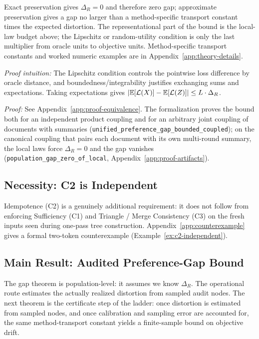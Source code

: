 \noindent Exact preservation gives $\Delta_R = 0$ and therefore zero gap; approximate preservation gives a gap no larger than a method-specific transport constant times the expected distortion. The representational part of the bound is the local-law budget above; the Lipschitz or random-utility condition is only the last multiplier from oracle units to objective units. Method-specific transport constants and worked numeric examples are in Appendix~\ref{app:theory-details}.

\noindent\textit{Proof intuition:} The Lipschitz condition controls the pointwise loss difference by oracle distance, and boundedness/integrability justifies exchanging sums and expectations. Taking expectations gives $|\mathbb{E}[\mathcal{L}(X)] - \mathbb{E}[\mathcal{L}(Z)]| \le L \cdot \Delta_R$.

\noindent\textit{Proof:} See Appendix~\ref{app:proof-equivalence}. The formalization proves the bound both for an independent product coupling and for an arbitrary joint coupling of documents with summaries (\texttt{unified\_preference\_gap\_bounded\_coupled}); on the canonical coupling that pairs each document with its own multi-round summary, the local laws force $\Delta_R = 0$ and the gap vanishes (\texttt{population\_gap\_zero\_of\_local}, Appendix~\ref{app:proof-artifacts}).

\subsection{Necessity: C2 is Independent}

Idempotence (C2) is a genuinely additional requirement: it does not follow from enforcing Sufficiency (C1) and Triangle / Merge Consistency (C3) on the fresh inputs seen during one-pass tree construction. Appendix~\ref{app:counterexample} gives a formal two-token counterexample (Example~\ref{ex:c2-independent}).

\subsection{Main Result: Audited Preference-Gap Bound}

The gap theorem is population-level: it assumes we know $\Delta_R$. The operational route estimates the actually realized distortion from sampled audit nodes. The next theorem is the certificate step of the ladder: once distortion is estimated from sampled nodes, and once calibration and sampling error are accounted for, the same method-transport constant yields a finite-sample bound on objective drift.

